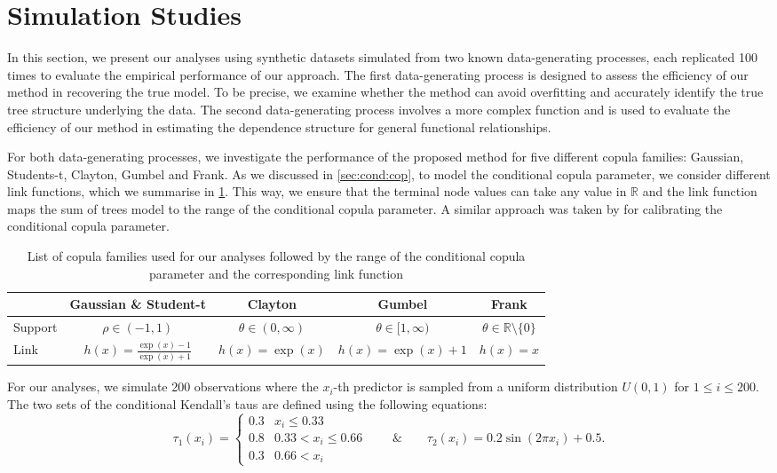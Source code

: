 \documentclass[
12pt]{article}
\begin{document}
	
	\section{Simulation Studies}\label{sec:sim}
	
	In this section, we present our analyses using synthetic datasets simulated from two known data-generating processes, each replicated 100 times to evaluate the empirical performance of our approach. The first data-generating process is designed to assess the efficiency of our method in recovering the true model. To be precise, we examine whether the method can avoid overfitting and accurately identify the true tree structure underlying the data. The second data-generating process involves a more complex function and is used to evaluate the efficiency of our method in estimating the dependence structure for general functional relationships.
	
	For both data-generating processes, we investigate the performance of the proposed method for five different copula families: Gaussian, Students-t, Clayton, Gumbel and Frank. As we discussed in \cref{sec:cond:cop}, to model the conditional copula parameter, we consider different link functions, which we summarise in \cref{tab:cop:link}. This way, we ensure that the terminal node values can take any value in $\mathbb{R}$ and the link function maps the sum of trees model to the range of the conditional copula parameter. A similar approach was taken by \citet{ABEGAZ201243,valle_cond_cop} for calibrating the conditional copula parameter.
	
	\begin{table}[h]
		\centering
		\begin{tabular}{l|c|c|c|c}
			& Gaussian \& Student-t & Clayton & Gumbel & Frank \\
			\hline
			Support 
			& $\rho \in (-1,1)$ 
			& $\theta \in (0,\infty)$ 
			& $\theta \in [1,\infty)$ 
			& $\theta \in \mathbb{R}\setminus\{0\}$ \\
			Link 
			& $h(x)=\frac{\exp(x)-1}{\exp(x)+1}$ 
			& $h(x)=\exp(x)$ 
			& $h(x)=\exp(x)+1$ 
			& $h(x)=x$ \\
		\end{tabular}
		\caption{List of copula families used for our analyses followed by the range of the conditional copula parameter and the corresponding link function}
		\label{tab:cop:link}
	\end{table}
	
	For our analyses, we simulate 200 observations where the $x_i$-th predictor is sampled from a uniform distribution $U(0,1)$ for $1\le i\le 200$. The two sets of the conditional Kendall's taus are defined using the following equations:
	\begin{equation}\label{eq:tree:tau}
		\tau_1(x_i) = \begin{cases}
			0.3 & x_i \le 0.33\\
			0.8 & 0.33 < x_i \le 0.66\\
			0.3 & 0.66 < x_i
		\end{cases}\qquad\&\qquad \tau_2(x_i) = 0.2\sin(2\pi x_i) + 0.5.
	\end{equation}
	
\end{document}
